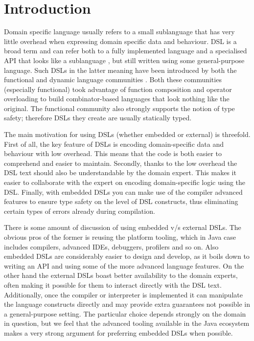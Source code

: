 \documentclass{sig-alternate}
\begin{document}

\section{Introduction}

Domain specific language usually refers to a small sublanguage that has very little overhead when expressing domain specific data and behaviour. DSL is a broad term \cite{vandeursen2000dsl,bentley1999pp} and can refer both to a fully implemented language and a specialised API that looks like a sublanguage \cite{hudak1996}, but still written using some general-purpose language. Such DSLs in the latter meaning have been introduced by both the functional \cite{bringert2004sph} and dynamic language communities \cite{cuadrado2007bds}. Both these communities (especially functional) took advantage of function composition and operator overloading to build combinator-based languages that look nothing like the original. The functional community also strongly supports the notion of type safety; therefore DSLs they create are usually statically typed.

The main motivation for using DSLs (whether embedded or external) is threefold. First of all, the key feature of DSLs is encoding domain-specific data and behaviour with low overhead. This means that the code is both easier to comprehend and easier to maintain. Secondly, thanks to the low overhead the DSL text should also be understandable by the domain expert. This makes it easier  to collaborate with the expert on encoding domain-specific logic using the DSL. Finally, with embedded DSLs you can make use of the compiler advanced features to ensure type safety on the level of DSL constructs, thus eliminating certain types of errors already during compilation.

There is some amount of discussion of using embedded v/s external DSLs. The obvious pros of the former is reusing the platform tooling, which in Java case includes compilers, advanced IDEs, debuggers, profilers and so on. Also embedded DSLs are considerably easier to design and develop, as it boils down to writing an API and using some of the more advanced language features. On the other hand the external DSLs boast better availability to the domain experts, often making it possible for them to interact directly with the DSL text. Additionally, once the compiler or interpreter is implemented it can manipulate the language constructs directly and may provide extra guarantees not possible in a general-purpose setting. The particular choice depends strongly on the domain in question, but we feel that the advanced tooling available in the Java ecosystem makes a very strong argument for preferring embedded DSLs when possible.
\end{document}
